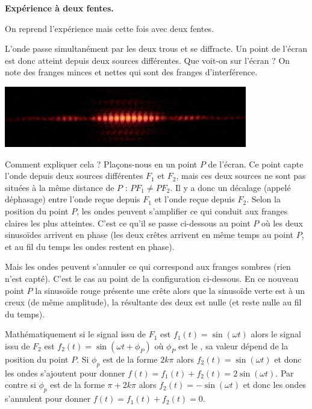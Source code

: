 \documentclass[11pt,class=report,crop=false]{standalone}
\begin{document}
\textbf{Expérience à deux fentes.}

On reprend l'expérience mais cette fois avec deux fentes.


 L'onde passe simultanément par les deux trous et se diffracte. Un point de l'écran est donc atteint depuis deux sources différentes. Que voit-on sur l'écran ? On note des franges minces et nettes qui sont des franges d'interférence. 

\begin{center}
\includegraphics[scale=\myscale,scale=0.9]{figures/fig-deux-fentes}
\end{center}

Comment expliquer cela ? Plaçons-nous en un point $P$ de l'écran. Ce point capte l'onde depuis deux sources différentes $F_1$ et $F_2$, mais ces deux sources ne sont pas situées à la même distance de $P$ : $PF_1 \neq PF_2$. Il y a donc un décalage (appelé déphasage) entre l'onde reçue depuis $F_1$ et l'onde reçue depuis $F_2$. Selon la position du point $P$, les ondes peuvent s'amplifier ce qui conduit aux franges claires les plus atteintes.
C'est ce qu'il se passe ci-dessous au point $P$ où les deux sinusoïdes arrivent en phase (les deux crêtes arrivent en même temps au point $P$, et au fil du temps les ondes restent en phase).


Mais les ondes peuvent s'annuler ce qui correspond aux franges sombres (rien n'est capté). C'est le cas au point de la configuration ci-dessous. En ce nouveau point $P$ la sinusoïde rouge présente une crête alors que la sinusoïde verte est à un creux (de même amplitude), la résultante des deux est nulle (et reste nulle au fil du temps).



Mathématiquement si le signal issu de $F_1$ est $f_1(t) = \sin(\omega t)$
alors le signal issu de $F_2$ est $f_2(t) = \sin(\omega t + \phi_P)$ où $\phi_P$ est le , sa valeur dépend de la position du point $P$.
Si $\phi_p$ est de la forme $2k\pi$ alors $f_2(t) = \sin(\omega t)$ et donc les ondes s'ajoutent pour donner $f(t) = f_1(t)+f_2(t) = 2\sin(\omega t)$.
Par contre si $\phi_p$ est de la forme $\pi + 2k\pi$ alors $f_2(t) = -\sin(\omega t)$ et donc les ondes s'annulent pour donner $f(t) = f_1(t)+f_2(t) = 0$.
\end{document}

